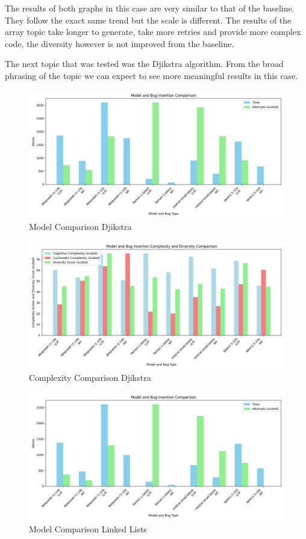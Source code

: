 \documentclass[12pt]{extarticle}
\begin{document}
The results of both graphs in this case are very similar to that of the baseline. They follow the exact same trend but the scale is different. The results of the array topic take longer to generate, take more retries and provide more complex code, the diversity however is not improved from the baseline.

The next topic that was tested was the Djikstra algorithm. From the broad phrasing of the topic we can expect to see more meaningful results in this case.

\begin{figure}[h!]
\centering
\includegraphics[width=0.8\linewidth]{Images/Model_Comparison_Djikstra.png}
\caption{Model Comparison Djikstra}
\label{fig:Model_Comparison_Djikstra}
\end{figure}

\begin{figure}[h!]
\centering
\includegraphics[width=0.8\linewidth]{Images/Complexity_Comparison_Djikstra.png}
\caption{Complexity Comparison Djikstra}
\label{fig:Complexity_Comparison_Djikstra}
\end{figure}

\begin{figure}[h!]
\centering
\includegraphics[width=0.8\linewidth]{Images/Model_Comparison_Linked_Lists.png}
\caption{Model Comparison Linked Lists}
\label{fig:Model_Comparison_Linked_Lists}
\end{figure}
\end{document}
